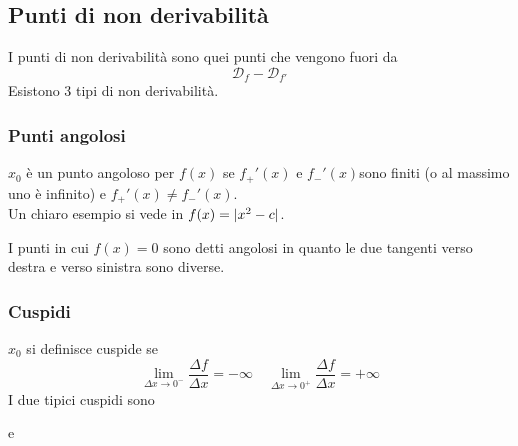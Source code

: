 \subsection{Punti di non derivabilità}
I punti di non derivabilità sono quei punti che vengono fuori da
\begin{equation*}
  \mathcal{D}_f - \mathcal{D}_{f'} 
\end{equation*}
Esistono 3 tipi di non derivabilità.
\subsubsection{Punti angolosi}
$x_0$ è un punto angoloso per $f(x)$ se $f_+'(x)$ e $f_-'(x) $sono finiti (o al massimo uno è 
infinito) e $f_+'(x)\neq f_-'(x)$.\\
Un chiaro esempio si vede in $f(x)=\lvert x^2-c\rvert$.
\begin{center}
\end{center}
I punti in cui $f(x)=0$ sono detti angolosi in quanto le due tangenti verso destra e verso sinistra
sono diverse.

\subsubsection{Cuspidi}
$x_0$ si definisce cuspide se
\begin{equation*}
  \lim\limits_{\Delta x\to 0^-} \frac{\Delta f}{\Delta x}=-\infty\quad
  \lim\limits_{\Delta x\to 0^+} \frac{\Delta f}{\Delta x}=+\infty
\end{equation*}
I due tipici cuspidi sono
\begin{center}
\end{center}
e
\begin{center}
\end{center}

